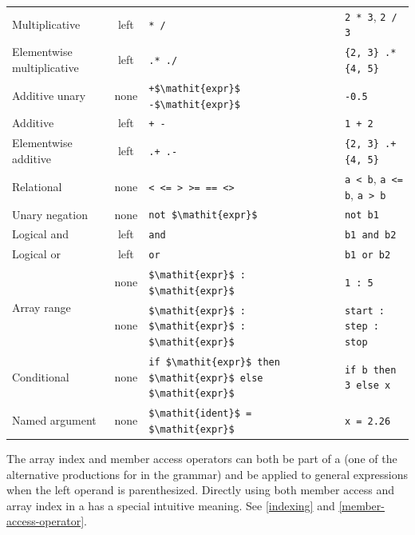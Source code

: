 \begin{table}[H]
\begin{center}
\begin{tabular}{l c l l}
\hline
Multiplicative & left & {\lstinline!* /!} & {\lstinline!2 * 3!}, {\lstinline!2 / 3!}\\
Elementwise multiplicative & left & {\lstinline!.* ./!} & {\lstinline!{2, 3} .* {4, 5}!}\\
\hline
Additive unary & none & {\lstinline!+$\mathit{expr}$ -$\mathit{expr}$!} & {\lstinline!-0.5!}\\
\hline
Additive & left & {\lstinline!+ -!} & {\lstinline!1 + 2!}\\
Elementwise additive & left & {\lstinline!.+ .-!} & {\lstinline!{2, 3} .+ {4, 5}!}\\
\hline
Relational & none & {\lstinline!< <= > >= == <>!} & {\lstinline!a < b!}, {\lstinline!a <= b!}, {\lstinline!a > b!}\\
\hline
Unary negation & none & {\lstinline!not $\mathit{expr}$!} & {\lstinline!not b1!}\\
\hline
Logical and & left & {\lstinline!and!} & {\lstinline!b1 and b2!}\\
\hline
Logical or & left & {\lstinline!or!} & {\lstinline!b1 or b2!}\\
\hline
\multirow{2}{*}{Array range} & none & {\lstinline!$\mathit{expr}$ : $\mathit{expr}$!} & {\lstinline!1 : 5!}\\
                             & none & {\lstinline!$\mathit{expr}$ : $\mathit{expr}$ : $\mathit{expr}$!} & {\lstinline!start : step : stop!}\\
\hline
Conditional & none & {\lstinline!if $\mathit{expr}$ then $\mathit{expr}$ else $\mathit{expr}$!} & {\lstinline!if b then 3 else x!}\\
\hline
Named argument & none & {\lstinline!$\mathit{ident}$ = $\mathit{expr}$!} & {\lstinline!x = 2.26!}\\
\hline
\end{tabular}
\end{center}
\end{table}

The array index and member access operators can both be part of a  (one of the alternative productions for  in the grammar) and be applied to general expressions when the left operand is parenthesized.
Directly using both member access and array index in a  has a special intuitive meaning.
See \cref{indexing} and \cref{member-access-operator}.

